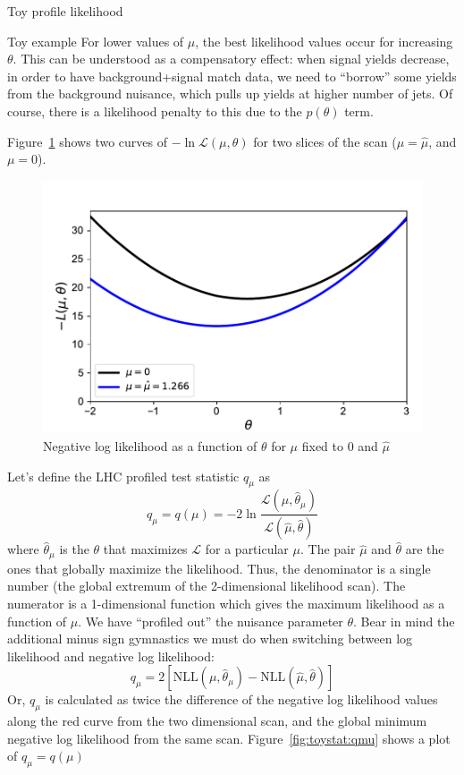 \begin{section}{Toy profile likelihood}
\begin{subsection}{Toy example}
For lower values of $\mu$, the best likelihood values occur
for increasing $\theta$. This can be understood as a compensatory effect: when
signal yields decrease, in order to have background+signal match data,
we need to ``borrow'' some yields from the background nuisance, which
pulls up yields at higher number of jets. Of course, there is a likelihood penalty
to this due to the $p(\theta)$ term.

Figure~\ref{fig:toystat:theta} shows two curves of
$-\ln\mathcal{L}(\mu,\theta)$ for two
slices of the scan ($\mu=\hat{\mu}$, and $\mu=0$).

\begin{figure}[!htb]
    \centering
    \includegraphics[width=0.80\linewidth]{figs/toy_statistics/likelihood_vs_theta.pdf}
    \caption{
Negative log likelihood as a function of $\theta$ for $\mu$ fixed to 0 and $\hat{\mu}$
    }
    \label{fig:toystat:theta}
\end{figure}

Let's define the LHC profiled test statistic $q_\mu$ as 
\begin{equation}
q_\mu = q(\mu) = -2\ln\frac{\mathcal{L}(\mu,\hat{\theta}_\mu)}{\mathcal{L}(\hat{\mu},\hat{\theta})}
\end{equation}
 where $\hat{\theta}_\mu$ is the $\theta$ that maximizes
$\mathcal{L}$ for a particular $\mu$. The pair $\hat{\mu}$ and
$\hat{\theta}$ are the ones that globally maximize the likelihood.
Thus, the denominator is a single number (the global extremum of the
2-dimensional likelihood scan). The numerator is a 1-dimensional function
which gives the maximum likelihood as a function of $\mu$. We have
``profiled out'' the nuisance parameter $\theta$. Bear in mind the
additional minus sign gymnastics we must do when switching between log
likelihood and negative log likelihood: 
\begin{equation}
q_\mu = 2\left[\mathrm{NLL}(\mu,\hat{\theta}_\mu) - \mathrm{NLL}(\hat{\mu},\hat{\theta})\right]
\end{equation}
 Or, $q_\mu$ is calculated as twice the difference of the negative log likelihood values
along the red curve from the two dimensional scan, and the global minimum negative log likelihood
from the same scan. Figure~\ref{fig:toystat:qmu} shows a plot of $q_\mu = q(\mu)$


\end{subsection}
\end{section}
